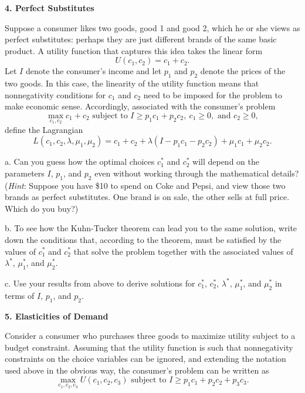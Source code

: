 \documentclass[12pt]{article}
\begin{document}
{\bfseries4. Perfect Substitutes}

Suppose a consumer likes two goods, good 1 and good 2, which he or she views as perfect substitutes: perhaps they are just different brands of the same basic product. A utility function that captures this idea takes the linear form
$$
U(c_{1},c_{2}) = c_{1} + c_{2}.
$$
Let $I$ denote the consumer's income and let $p_{1}$ and $p_{2}$ denote the prices of the two goods. In this case, the linearity of the utility function means that nonnegativity conditions for $c_{1}$ and $c_{2}$ need to be imposed for the problem to make economic sense. Accordingly, associated with the consumer's problem
$$
\max_{c_{1},c_{2}} c_{1} + c_{2} \text{ subject to } I \geq p_{1}c_{1}+p_{2}c_{2}, \ c_{1} \geq 0, \text{ and } c_{2} \geq 0,
$$
define the Lagrangian
$$
L(c_{1},c_{2},\lambda,\mu_{1},\mu_{2}) = c_{1} + c_{2} + \lambda(I-p_{1}c_{1}-p_{2}c_{2}) + \mu_{1}c_{1} + \mu_{2}c_{2}.
$$
\begin{description}
\item a. Can you guess how the optimal choices $c_{1}^{*}$ and $c_{2}^{*}$ will depend on the parameters $I$, $p_{1}$, and $p_{2}$ even without working through the mathematical details? (\emph{Hint}: Suppose you have \$10 to spend on Coke and Pepsi, and view those two brands as perfect substitutes. One brand is on sale, the other sells at full price. Which do you buy?)
\item b. To see how the Kuhn-Tucker theorem can lead you to the same solution, write down the conditions that, according to the theorem, must be satisfied by the values of $c_{1}^{*}$ and $c_{2}^{*}$ that solve the problem together with the associated values of $\lambda^{*}$, $\mu_{1}^{*}$, and $\mu_{2}^{*}$.
\item c. Use your results from above to derive solutions for $c_{1}^{*}$, $c_{2}^{*}$,  $\lambda^{*}$, $\mu_{1}^{*}$, and $\mu_{2}^{*}$ in terms of $I$, $p_{1}$, and $p_{2}$.
\end{description}

{\bfseries 5. Elasticities of Demand}

Consider a consumer who purchases three goods to maximize utility subject to a budget constraint. Assuming that the utility function is such that nonnegativity constraints on the choice variables can be ignored, and extending the notation used above in the obvious way, the consumer's problem can be written as
$$
\max_{c_{1},c_{2},c_{3}} U(c_{1},c_{2},c_{3}) \text{ subject to } I \geq p_{1}c_{1}+p_{2}c_{2}+p_{3}c_{3}.
$$
\end{document}
